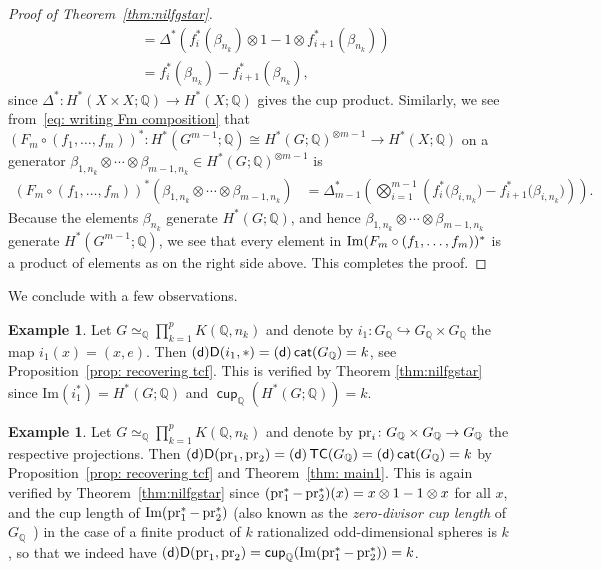 \documentclass[amscd,amssymb,verbatim,10pt]{amsart}
\numberwithin{equation}{section}
\theoremstyle{plain}
\theoremstyle{definition}
\newtheorem{ex}[theorem]{Example}
\DeclareMathOperator{\cat}{{\mathsf{cat}}}
\DeclareMathOperator{\TC}{{\mathsf{TC}}}
\DeclareMathOperator{\cu}{{\mathsf{cup}}}
\def\Im{\protect\operatorname{Im}}
\def\pr{\protect\operatorname{pr}}
\def\Q{{\mathbb Q}}
\newcommand{\D}{{\sf {D}}}
\newcommand{\sd}{{(\sf {d})}}
\begin{document}
\begin{proof}[Proof of Theorem~\ref{thm:nilfgstar}]
\begin{align*}
& = \Delta^*(f_i^*(\beta_{n_k}) \otimes 1 - 1 \otimes f_{i+1}^*(\beta_{n_k})) \\
& = f_i^*(\beta_{n_k}) - f_{i+1}^*(\beta_{n_k}),
\end{align*}
since $\Delta^*\colon H^*(X\times X;\Q)\to H^*(X;\Q)$ gives the cup product. 
Similarly, we see from~\eqref{eq: writing Fm composition} that $(F_m\circ (f_1,\dots,f_m))^*\colon H^*(G^{m-1};\Q)\cong H^*(G;\Q)^{\otimes m-1}\to H^*(X;\Q)$ on a generator $\beta_{1,n_k}\otimes\cdots\otimes \beta_{m-1,n_k}\in H^*(G;\Q)^{\otimes m-1}$ is
\begin{align*}
(F_m\circ (f_1,\dots,f_m))^*(\beta_{1,n_k}\otimes\cdots\otimes \beta_{m-1,n_k}) & = \Delta_{m-1}^*\left(\bigotimes_{i=1}^{m-1}\left(f_i^*\bigl(\beta_{i,n_k}\bigr) - f_{i+1}^*\bigl(\beta_{i,n_k}\bigr)\right)\right).
\end{align*}
Because the elements $\beta_{n_k}$ generate $H^*(G;\Q)$, and hence $\beta_{1,n_k}\otimes\cdots\otimes \beta_{m-1,n_k}$ generate $H^*(G^{m-1};\Q)$, we see that every element in $\Im(F_m\circ (f_1,\dots,f_{m}))^*$ is a product of elements as on the right side above. This completes the proof.
\end{proof}

We conclude with a few observations.

\begin{ex}
Let $G\simeq_\Q \prod_{k=1}^p K(\Q,n_k)$ and denote by $i_1\colon G_\Q \hookrightarrow G_\Q \times G_\Q$ the map $i_1(x)=(x,e)$. Then  $\sd\D(i_1,*)=\sd\cat(G_\Q)=k$, see Proposition~\ref{prop: recovering tcf}. This is verified by Theorem \ref{thm:nilfgstar} since $\mathrm{Im}(i_1^*)=H^*(G;\Q)$ and 
$\cu_\Q(H^*(G;\Q))=k$.
\end{ex}

\begin{ex}
Let $G\simeq_\Q \prod_{k=1}^p K(\Q,n_k)$ and denote by $\pr_i\colon G_\Q \times G_\Q \to G_\Q$ the respective projections. Then 
$\sd\D(\pr_1,\pr_2)=\sd\TC(G_\Q)=\sd\cat(G_\Q)=k$ by Proposition~\ref{prop: recovering tcf} and Theorem~\ref{thm: main1}. This is again verified by Theorem~\ref{thm:nilfgstar} since $(\pr_1^*-\pr_2^*)(x)=x\otimes 1 - 1\otimes x$ for all $x$, and the cup length of $\Im(\pr_1^*-\pr_2^*)$ (also known as the \emph{zero-divisor cup length} of $G_\Q$~\cite{Far}) in the case of a finite product of $k$ rationalized odd-dimensional spheres is $k$, so that we indeed have $\sd\D(\pr_1,\pr_2)=\cu_\Q(\Im(\pr_1^*-\pr_2^*))=k$. 
\end{ex}
\end{document}

